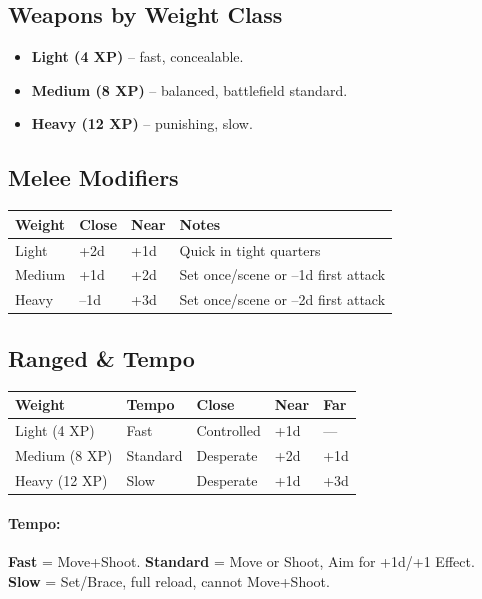 \subsection{Weapons by Weight Class}
\label{sec:weapon-weight}
\begin{itemize}
  \item \textbf{Light (4 XP)} – fast, concealable.
  \item \textbf{Medium (8 XP)} – balanced, battlefield standard.
  \item \textbf{Heavy (12 XP)} – punishing, slow.
\end{itemize}

\subsection{Melee Modifiers}
\begin{center}
\begin{tabular}{llll}
\toprule
\textbf{Weight} & \textbf{Close} & \textbf{Near} & \textbf{Notes} \\
\midrule
Light & +2d & +1d & Quick in tight quarters \\
Medium & +1d & +2d & Set once/scene or –1d first attack \\
Heavy & –1d & +3d & Set once/scene or –2d first attack \\
\bottomrule
\end{tabular}
\end{center}

\subsection{Ranged \& Tempo}
\begin{center}
\begin{tabular}{lllll}
\toprule
\textbf{Weight} & \textbf{Tempo} & \textbf{Close} & \textbf{Near} & \textbf{Far} \\
\midrule
Light (4 XP) & Fast & Controlled & +1d & — \\
Medium (8 XP) & Standard & Desperate & +2d & +1d \\
Heavy (12 XP) & Slow & Desperate & +1d & +3d \\
\bottomrule
\end{tabular}
\end{center}

\paragraph{Tempo:} \textbf{Fast} = Move+Shoot. \textbf{Standard} = Move or Shoot, Aim for +1d/+1 Effect. \textbf{Slow} = Set/Brace, full reload, cannot Move+Shoot.

